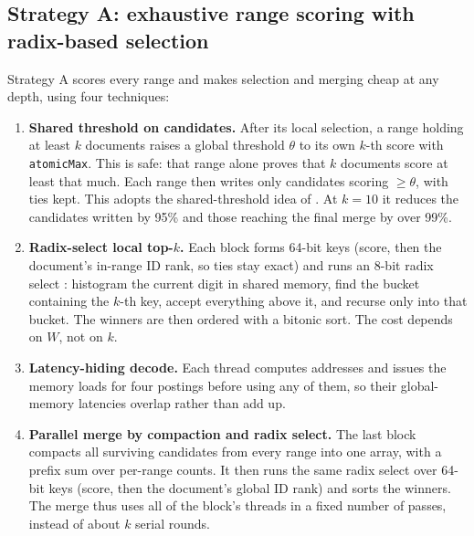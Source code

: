 \documentclass[11pt]{article}
\begin{document}
\subsection{Strategy A: exhaustive range scoring with radix-based selection}
Strategy A scores every range and makes selection and merging cheap at any depth, using four techniques:
\begin{enumerate}
\item \textbf{Shared threshold on candidates.} After its local selection, a range holding at least $k$
  documents raises a global threshold $\theta$ to its own $k$-th score with \texttt{atomicMax}. This is
  safe: that range alone proves that $k$ documents score at least that much. Each range then writes
  only candidates scoring $\geq\theta$, with ties kept. This adopts the shared-threshold idea of
  \cite{gaiosowand}. At $k=10$ it reduces the candidates written by 95\% and those reaching the final
  merge by over 99\%.
\item \textbf{Radix-select local top-$k$.} Each block forms 64-bit keys (score, then the document's
  in-range ID rank, so ties stay exact) and runs an 8-bit radix select \cite{radik,airtopk}: histogram
  the current digit in shared memory, find the bucket containing the $k$-th key, accept everything
  above it, and recurse only into that bucket. The winners are then ordered with a bitonic sort. The cost
  depends on $W$, not on $k$.
\item \textbf{Latency-hiding decode.} Each thread computes addresses and issues the memory loads for four
  postings before using any of them, so their global-memory latencies overlap rather than add up.
\item \textbf{Parallel merge by compaction and radix select.} The last block compacts all surviving
  candidates from every range into one array, with a prefix sum over per-range counts. It then runs the
  same radix select over 64-bit keys (score, then the document's global ID rank) and sorts the winners.
  The merge thus uses all of the block's threads in a fixed number of passes, instead of about $k$
  serial rounds.
\end{enumerate}
\end{document}
